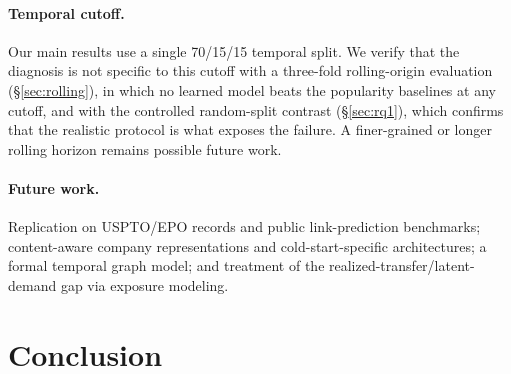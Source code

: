 \documentclass[preprint,12pt]{elsarticle}
\begin{document}
\paragraph{Temporal cutoff.} Our main results use a single 70/15/15 temporal split. We
verify that the diagnosis is not specific to this cutoff with a three-fold
rolling-origin evaluation (\S\ref{sec:rolling}), in which no learned model beats the
popularity baselines at any cutoff, and with the controlled random-split contrast
(\S\ref{sec:rq1}), which confirms that the realistic protocol is what exposes the
failure. A finer-grained or longer rolling horizon remains possible future work.

\paragraph{Future work.} Replication on USPTO/EPO records and public link-prediction
benchmarks; content-aware company representations and cold-start-specific
architectures; a formal temporal graph model; and treatment of the
realized-transfer/latent-demand gap via exposure modeling.

\section{Conclusion}
\label{sec:conclusion}
\end{document}
